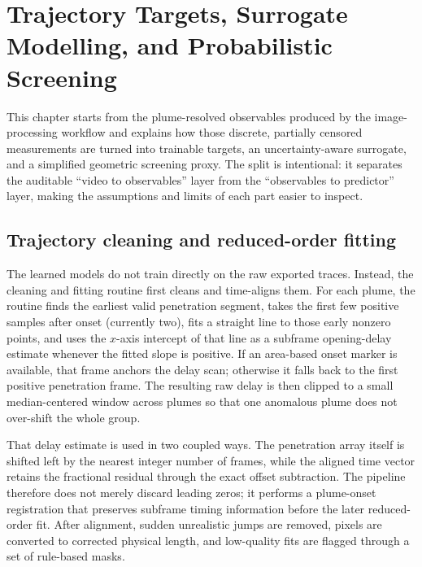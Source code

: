 \documentclass[english, 12pt, a4paper, elec, utf8, a-2b, online]{aaltothesis}
\begin{document}
\section{Trajectory Targets, Surrogate Modelling, and Probabilistic Screening}

This chapter starts from the plume-resolved observables produced by the image-processing workflow and explains how those discrete, partially censored measurements are turned into trainable targets, an uncertainty-aware surrogate, and a simplified geometric screening proxy. The split is intentional: it separates the auditable ``video to observables'' layer from the ``observables to predictor'' layer, making the assumptions and limits of each part easier to inspect.

\subsection{Trajectory cleaning and reduced-order fitting}

The learned models do not train directly on the raw exported traces. Instead, the cleaning and fitting routine first cleans and time-aligns them. For each plume, the routine finds the earliest valid penetration segment, takes the first few positive samples after onset (currently two), fits a straight line to those early nonzero points, and uses the \(x\)-axis intercept of that line as a subframe opening-delay estimate whenever the fitted slope is positive. If an area-based onset marker is available, that frame anchors the delay scan; otherwise it falls back to the first positive penetration frame. The resulting raw delay is then clipped to a small median-centered window across plumes so that one anomalous plume does not over-shift the whole group.

That delay estimate is used in two coupled ways. The penetration array itself is shifted left by the nearest integer number of frames, while the aligned time vector retains the fractional residual through the exact offset subtraction. The pipeline therefore does not merely discard leading zeros; it performs a plume-onset registration that preserves subframe timing information before the later reduced-order fit. After alignment, sudden unrealistic jumps are removed, pixels are converted to corrected physical length, and low-quality fits are flagged through a set of rule-based masks.
\end{document}
